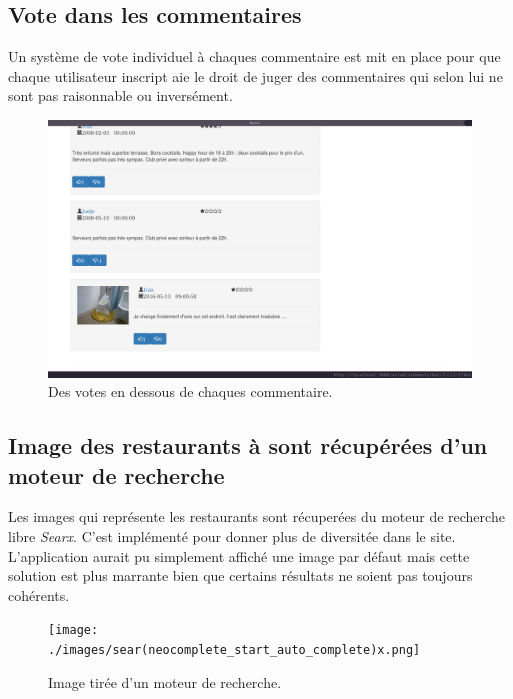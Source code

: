 \documentclass[a4paper,10pt]{article}
\begin{document}
\subsection{Vote dans les commentaires}
    Un système de vote individuel à chaques commentaire est mit en place pour
    que chaque utilisateur inscript aie le droit de juger des commentaires
    qui selon lui ne sont pas raisonnable ou inversément.

    \begin{figure}[h]
        \centering
        \includegraphics[scale=0.3]{./images/picture.png}
        \caption{Des votes en dessous de chaques commentaire.}
    \end{figure}

\subsection{Image des restaurants à sont récupérées d'un moteur de recherche}
    Les images qui représente les restaurants sont récuperées du moteur de
    recherche libre \emph{Searx}. C'est implémenté pour donner plus de
    diversitée dans le site. L'application aurait pu simplement affiché une
    image par défaut mais cette solution est plus marrante bien que certains
    résultats ne soient pas toujours cohérents.

    \begin{figure}[h]
        \centering
        \texttt{[image: ./images/sear(neocomplete\_start\_auto\_complete)x.png]}
        \caption{Image tirée d'un moteur de recherche.}
    \end{figure}
\end{document}
